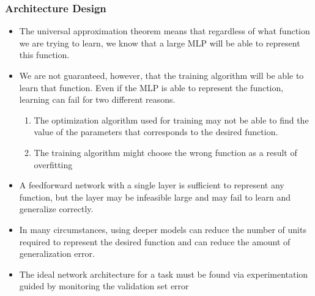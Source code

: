 \documentclass[
  shownotes,
  xcolor={svgnames},
  hyperref={colorlinks,citecolor=DarkBlue,linkcolor=DarkRed,urlcolor=DarkBlue}
  , aspectratio=169]{beamer}
\begin{document}
\begin{frame}
\frametitle{Architecture Design}

\begin{itemize}

    \item The universal approximation theorem means that regardless of what function we are trying to learn, we know that a large MLP will be able to represent this function. 
    \item We are not guaranteed, however, that the training algorithm will be able to learn that function. Even if the MLP is able to represent the function, learning can fail for two different reasons. 
            \begin{enumerate}
                \item The optimization algorithm used
                for training may not be able to find the value of the parameters that corresponds
                to the desired function. 
                \item The training algorithm might choose the wrong function as a result of overﬁtting
            \end{enumerate}


    \item A feedforward network with a single layer is sufficient to represent any function, but the layer may be infeasible large and may fail to learn and generalize correctly.

    \item  In many circumstances, using deeper models can reduce the number of units required to represent the desired function and can reduce the amount of generalization error.
    \item  The ideal network architecture for a task must be found via experimentation guided by monitoring the validation set error
\end{itemize}
\end{frame}
\end{document}
